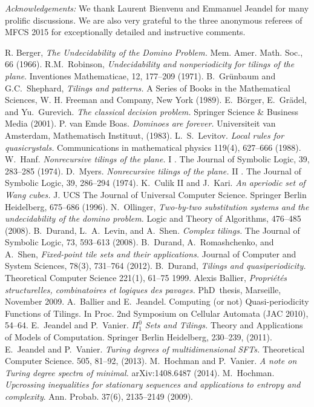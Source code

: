 \documentclass[runningheads]{llncs}
\begin{document}
\smallskip

\emph{Acknowledgements:} We thank Laurent Bienvenu and Emmanuel Jeandel for many prolific discussions. We are also very grateful to the three anonymous referees of MFCS 2015 for exceptionally detailed and instructive comments.


\begin{thebibliography}{19}
 R. Berger, \emph{The Undecidability of the Domino Problem.} Mem. Amer. Math. Soc., 66 (1966).
 R.M.~Robinson, \emph{Undecidability and nonperiodicity for tilings of the plane}. Inventiones Mathematicae, 12, 177--209 (1971).
 B.~Gr\"unbaum and G.C.~Shephard, \emph{Tilings and patterns.} A Series of Books in the Mathematical Sciences, W. H. Freeman and Company, New York (1989). E.~B\"orger,  E.~Gr\"adel, and Yu.~Gurevich. \emph{The classical decision problem.} Springer Science \& Business Media (2001).
 P. van Emde Boas. \emph{Dominoes are forever.}  Universiteit van Amsterdam, Mathematisch Instituut, (1983).
 L.~S.~Levitov. \emph{Local rules for quasicrystals.}  Communications in mathematical physics 119(4),  627--666 (1988).
  W.~Hanf. \emph{Nonrecursive tilings of the plane.} I . The Journal of Symbolic Logic,  39, 283--285 (1974). 
  D.~Myers. \emph{Nonrecursive tilings of the plane.} II . The Journal of Symbolic Logic,  39,  286--294 (1974).  
 K.~Culik II and J.~Kari. \emph{An aperiodic set of Wang cubes.} J. UCS The Journal of Universal Computer Science. Springer Berlin Heidelberg,  675--686 (1996).
 N.~Ollinger, \emph{Two-by-two substitution systems and the undecidability of the domino problem.}
Logic and Theory of Algorithms, 476--485 (2008).
 B.~Durand, L.~A.~Levin, and A.~Shen. \emph{Complex tilings.} The Journal of Symbolic Logic, 73,  593--613 (2008).
 B.~Durand, A.~Romashchenko, and A.~Shen, \emph{Fixed-point tile sets and their applications.}
Journal of Computer and System Sciences, 78(3), 731--764 (2012).
 B.~Durand, \emph{Tilings and quasiperiodicity.}  Theoretical Computer Science 221(1),  61--75 1999.
 Alexis Ballier, \emph{Propri\'et\'es structurelles, combinatoires et logiques des pavages.} PhD~thesis, Marseille, November 2009.
 A.~Ballier and E.~Jeandel. Computing (or not) Quasi-periodicity Functions of Tilings. In Proc. 
2nd Symposium on Cellular Automata (JAC 2010), 54--64. 
  E.~Jeandel and P.~Vanier. \emph{$\Pi^0_1$ Sets and Tilings.} Theory and Applications of Models of Computation. Springer Berlin Heidelberg,  230--239, (2011).
 E.~Jeandel and P.~Vanier. \emph{Turing degrees of multidimensional SFTs.}  Theoretical Computer Science. 505, 81--92, (2013).
 M.~Hochman and P.~Vanier. \emph{A note on Turing degree spectra of minimal.}  arXiv:1408.6487 (2014). 
 M.~Hochman. \emph{Upcrossing inequalities for stationary sequences and applications to entropy and complexity}.
Ann. Probab. 37(6), 2135--2149 (2009).
\end{thebibliography}
\end{document}
